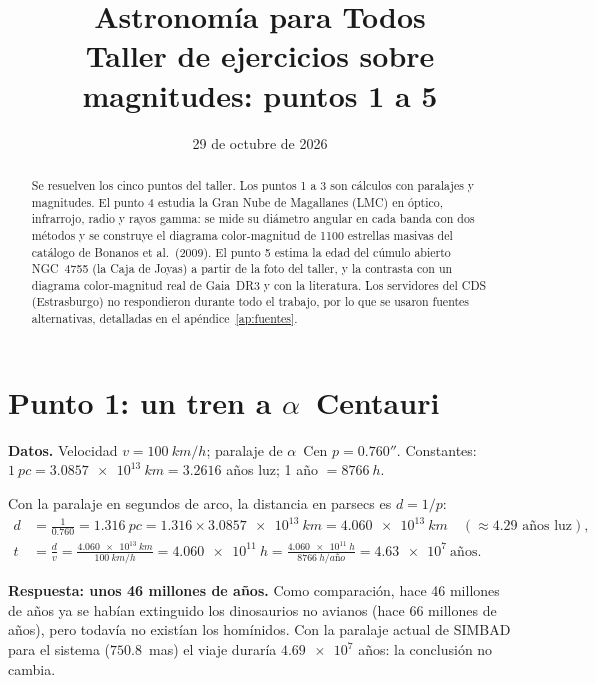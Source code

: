 \documentclass[11pt,a4paper]{article}
\title{Astronomía para Todos\\[4pt]\large Taller de ejercicios sobre magnitudes: puntos 1 a 5}
\author{\autor}
\date{29 de octubre de 2026}
\begin{document}
\maketitle

\begin{abstract}
Se resuelven los cinco puntos del taller. Los puntos 1 a 3 son cálculos con paralajes y
magnitudes. El punto 4 estudia la Gran Nube de Magallanes (LMC) en óptico, infrarrojo, radio y
rayos gamma: se mide su diámetro angular en cada banda con dos métodos y se construye el diagrama
color-magnitud de 1100 estrellas masivas del catálogo de Bonanos et al.\ (2009). El punto 5 estima la
edad del cúmulo abierto NGC~4755 (la Caja de Joyas) a partir de la foto del taller, y la contrasta
con un diagrama color-magnitud real de Gaia~DR3 y con la literatura. Los servidores del CDS
(Estrasburgo) no respondieron durante todo el trabajo, por lo que se usaron fuentes alternativas,
detalladas en el apéndice~\ref{ap:fuentes}.
\end{abstract}

\tableofcontents

\section{Punto 1: un tren a $\alpha$~Centauri}

\textbf{Datos.} Velocidad $v = \SI{100}{km/h}$; paralaje de $\alpha$~Cen $p = 0.760''$.
Constantes: $\SI{1}{pc} = \SI{3.0857e13}{km} = \num{3.2616}$ años luz; 1 año $= \SI{8766}{h}$.

Con la paralaje en segundos de arco, la distancia en parsecs es $d = 1/p$:
\begin{align}
d &= \frac{1}{0.760} = \SI{1.316}{pc} = 1.316 \times \SI{3.0857e13}{km} = \SI{4.060e13}{km}
\quad (\approx 4.29 \text{ años luz}),\\
t &= \frac{d}{v} = \frac{\SI{4.060e13}{km}}{\SI{100}{km/h}} = \SI{4.060e11}{h}
= \frac{\SI{4.060e11}{h}}{\SI{8766}{h/año}} = \num{4.63e7}\ \text{años}.
\end{align}

\textbf{Respuesta: unos 46 millones de años.} Como comparación, hace 46 millones de años ya se
habían extinguido los dinosaurios no avianos (hace 66 millones de años), pero todavía no existían
los homínidos. Con la paralaje actual de SIMBAD para el sistema ($750.8$~mas) el viaje duraría
$\num{4.69e7}$ años: la conclusión no cambia.
\end{document}
